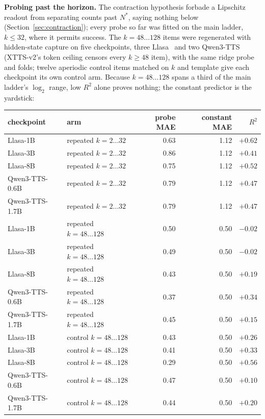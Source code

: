 \noindent\textbf{Probing past the horizon.} The contraction hypothesis
forbade a Lipschitz readout from separating counts past $N^\ast$,
saying nothing below (Section~\ref{sec:contraction}); every probe so
far was fitted on the main ladder, $k\le32$, where it permits success.
The $k=48\ldots128$ items were regenerated with hidden-state capture on
five checkpoints, three Llasa~\cite{ye2025llasa} and two
Qwen3-TTS~\cite{hu2026qwen3tts} (XTTS-v2's token ceiling censors every
$k\ge48$ item), with the same ridge probe and folds; twelve aperiodic
control items matched on $k$ and template give each checkpoint its own
control arm. Because $k=48\ldots128$ spans a third of the main ladder's
$\log_2$ range, low $R^2$ alone proves nothing; the constant predictor
is the yardstick:
\begin{center}
\begin{tabular}{llrrr}
\toprule
checkpoint & arm & probe MAE & constant MAE & $R^2$ \\
\midrule
Llasa-1B       & repeated $k=2\ldots32$    & 0.63 & 1.12 & $+0.62$ \\
Llasa-3B       & repeated $k=2\ldots32$    & 0.86 & 1.12 & $+0.41$ \\
Llasa-8B       & repeated $k=2\ldots32$    & 0.75 & 1.12 & $+0.52$ \\
Qwen3-TTS-0.6B & repeated $k=2\ldots32$    & 0.79 & 1.12 & $+0.47$ \\
Qwen3-TTS-1.7B & repeated $k=2\ldots32$    & 0.79 & 1.12 & $+0.47$ \\
\midrule
Llasa-1B       & repeated $k=48\ldots128$  & 0.50 & 0.50 & $-0.02$ \\
Llasa-3B       & repeated $k=48\ldots128$  & 0.49 & 0.50 & $-0.02$ \\
Llasa-8B       & repeated $k=48\ldots128$  & 0.43 & 0.50 & $+0.19$ \\
Qwen3-TTS-0.6B & repeated $k=48\ldots128$  & 0.37 & 0.50 & $+0.34$ \\
Qwen3-TTS-1.7B & repeated $k=48\ldots128$  & 0.45 & 0.50 & $+0.15$ \\
\midrule
Llasa-1B       & control $k=48\ldots128$   & 0.43 & 0.50 & $+0.26$ \\
Llasa-3B       & control $k=48\ldots128$   & 0.41 & 0.50 & $+0.33$ \\
Llasa-8B       & control $k=48\ldots128$   & 0.29 & 0.50 & $+0.56$ \\
Qwen3-TTS-0.6B & control $k=48\ldots128$   & 0.47 & 0.50 & $+0.10$ \\
Qwen3-TTS-1.7B & control $k=48\ldots128$   & 0.44 & 0.50 & $+0.20$ \\
\bottomrule
\end{tabular}
\end{center}
